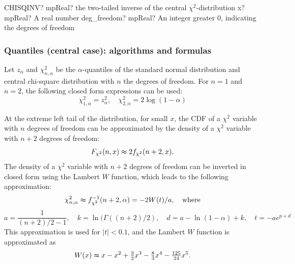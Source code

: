 \vspace{0.6cm}
\begin{mpFunctionsExtract}
	\mpWorksheetFunctionTwoNotImplemented
	{CHISQINV? mpReal? the two-tailed inverse of the central $\chi^2$-distribution}
	{x? mpReal? A real number}
	{deg\_freedom? mpReal? An integer  greater 0, indicating the degrees of freedom}
\end{mpFunctionsExtract}



\subsubsection{Quantiles (central case): algorithms and formulas}
\label{ChiSquareDistributionQuantilesAlgorithm}

Let $z_\alpha$ and $\chi^2_{n,\alpha}$ be the $\alpha$-quantiles  of the standard normal distribution and central chi-square distribution with $n$ the degrees of freedom. For $n=1$ and $n=2$, the following closed form expressions can be used:
\begin{equation}
\chi^2_{1,\alpha} = z^2_{\alpha}, \quad \chi^2_{2,\alpha} = 2 \log(1 - \alpha)
\end{equation}

\vpara
At the extreme left tail of the distribution, for small $x$, the CDF of a $\chi^2$ variable with $n$ degrees of freedom can be approximated by the density of a $\chi^2$ variable with $n+2$ degrees of freedom:
\begin{equation*}
F_{\chi^2}(n,x)  \thickapprox 2 f_{\chi^2}(n+2,x).
\end{equation*}
The density of a $\chi^2$ variable with $n+2$ degrees of freedom can be inverted in closed form using the Lambert $W$ function, which leads to the following approximation:
\begin{equation}
\chi^2_{n,\alpha} \thickapprox  f^{-1}_{\chi^2}(n+2,\alpha) = -2 W(t)/a  , \quad \text{where} 
\end{equation}
\begin{equation*}
a=\frac{1}{(n+2)/2-1}, \quad k=\ln(\Gamma((n+2)/2), \quad d=a-\ln(1-\alpha)+k, \quad t=-a e^{p+d}
\end{equation*}
This approximation is used for $|t|<0.1$, and the Lambert $W$ function is approximated as
\begin{equation*}
W(x)  \thickapprox x - x^2 + \tfrac{3}{2} x^3 - \tfrac{8}{3} x^4 - \tfrac{125}{24} x^5.
\end{equation*}

